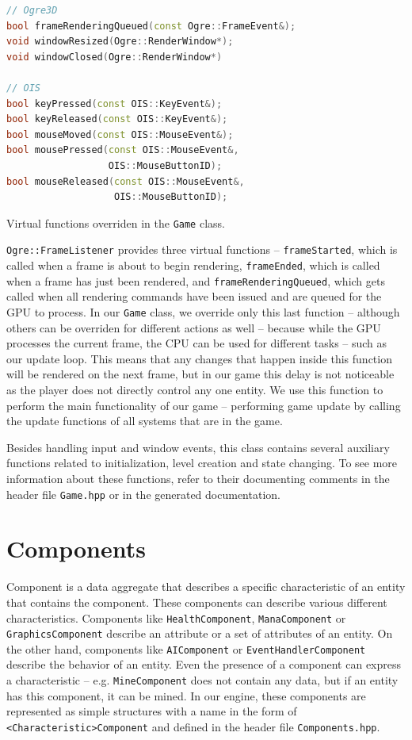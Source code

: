 \begin{listing}[H]
    \centering
    \begin{lstlisting}[language=C++]
// Ogre3D
bool frameRenderingQueued(const Ogre::FrameEvent&);
void windowResized(Ogre::RenderWindow*);
void windowClosed(Ogre::RenderWindow*)

// OIS
bool keyPressed(const OIS::KeyEvent&);
bool keyReleased(const OIS::KeyEvent&);
bool mouseMoved(const OIS::MouseEvent&);
bool mousePressed(const OIS::MouseEvent&,
                  OIS::MouseButtonID);
bool mouseReleased(const OIS::MouseEvent&,
                   OIS::MouseButtonID);
    \end{lstlisting}
    \caption{Virtual functions overriden in the \texttt{Game} class.}
    \label{ois-ogre-callbacks}
\end{listing}

\texttt{Ogre::FrameListener} provides three virtual functions -- \texttt{frameStarted}, which is called when a frame
is about to begin rendering, \texttt{frameEnded}, which is called when a frame has just been rendered, and \texttt{frameRenderingQueued},
which gets called when all rendering commands have been issued and are queued for the GPU to process. In our \texttt{Game} class, we override
only this last function -- although others can be overriden for different actions as well -- because while the GPU processes the current
frame, the CPU can be used for different tasks -- such as our update loop. This means that any changes that happen inside this function
will be rendered on the next frame, but in our game this delay is not noticeable as the player does not directly control any one entity.
We use this function to perform the main functionality of our game -- performing game update by calling the update functions of all
systems that are in the game.

Besides handling input and window events, this class contains several auxiliary functions related to initialization, level creation and
state changing. To see more information about these functions, refer to their documenting comments in the header file \texttt{Game.hpp} or
in the generated documentation.

\section{Components}

Component is a data aggregate that describes a specific characteristic of an entity that contains the component.
These components can describe various different characteristics. Components like \texttt{HealthComponent}, \texttt{ManaComponent}
or \texttt{GraphicsComponent} describe an attribute or a set of attributes of an entity. On the other hand, components like
\texttt{AIComponent} or \texttt{EventHandlerComponent} describe the behavior of an entity. Even the presence of a
component can express a characteristic -- e.g. \texttt{MineComponent} does not contain any data, but if an entity has this component, it
can be mined. In our engine, these
components are represented as simple structures with a name in the form of \texttt{<Characteristic>Component} and defined in the header file
\texttt{Components.hpp}. 


